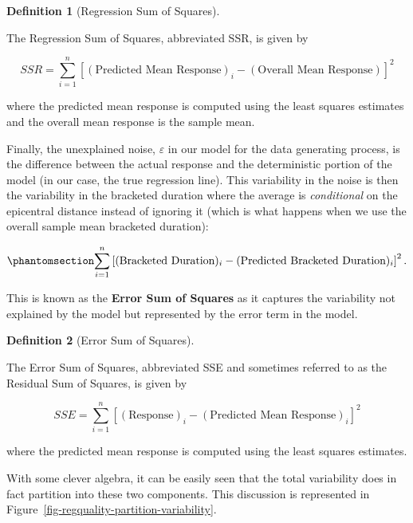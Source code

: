 \documentclass[
  letterpaper,
  DIV=11,
  numbers=noendperiod]{scrreprt}
\theoremstyle{plain}
\theoremstyle{definition}
\theoremstyle{definition}
\newtheorem{definition}{Definition}[chapter]
\theoremstyle{remark}
\begin{document}
\begin{definition}[Regression Sum of
Squares]\protect\hypertarget{def-ssr}{}\label{def-ssr}

The Regression Sum of Squares, abbreviated SSR, is given by

\[SSR = \sum_{i=1}^{n} \left[(\text{Predicted Mean Response})_i - (\text{Overall Mean Response})\right]^2\]

where the predicted mean response is computed using the least squares
estimates and the overall mean response is the sample mean.

\end{definition}

Finally, the unexplained noise, \(\varepsilon\) in our model for the
data generating process, is the difference between the actual response
and the deterministic portion of the model (in our case, the true
regression line). This variability in the noise is then the variability
in the bracketed duration where the average is \emph{conditional} on the
epicentral distance instead of ignoring it (which is what happens when
we use the overall sample mean bracketed duration):

\begin{equation}\phantomsection\label{eq-regquality-sse}{\sum_{i=1}^{n} \left[(\text{Bracketed Duration})_i - (\text{Predicted Bracketed Duration})_i\right]^2.}\end{equation}

This is known as the \textbf{Error Sum of Squares} as it captures the
variability not explained by the model but represented by the error term
in the model.

\begin{definition}[Error Sum of
Squares]\protect\hypertarget{def-sse}{}\label{def-sse}

The Error Sum of Squares, abbreviated SSE and sometimes referred to as
the Residual Sum of Squares, is given by

\[SSE = \sum_{i=1}^{n} \left[(\text{Response})_i - (\text{Predicted Mean Response})_i\right]^2\]

where the predicted mean response is computed using the least squares
estimates.

\end{definition}

With some clever algebra, it can be easily seen that the total
variability does in fact partition into these two components. This
discussion is represented in
Figure~\ref{fig-regquality-partition-variability}.
\end{document}
